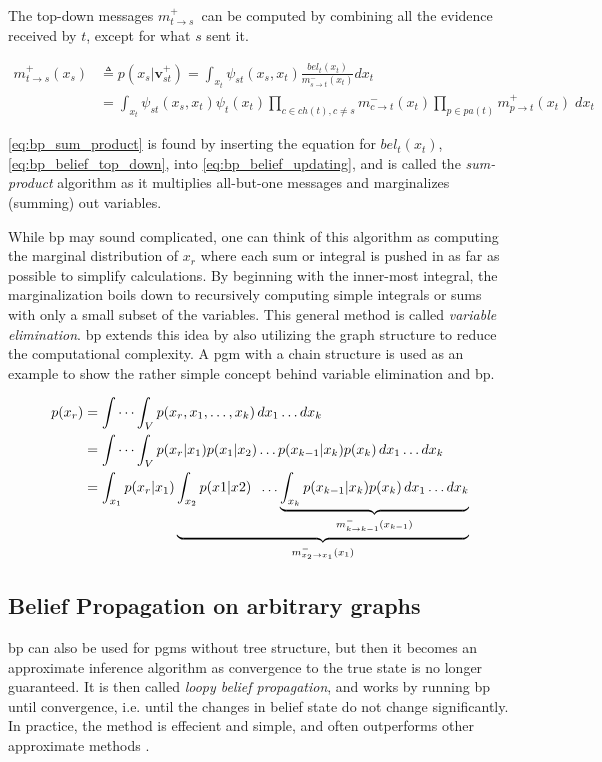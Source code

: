 The top-down messages $m_{t \to s}^+$ can be computed by combining all the evidence received by $t$, except for what $s$ sent it.

\begin{subequations}
\begin{align}
    m_{t \to s}^+(x_s) &\triangleq p(x_s | \mathbf{v}_{st}^+) = \int_{x_t}\psi_{st}(x_s, x_t)\frac{bel_t(x_t)}{m_{s \to t}^-(x_t)}dx_t \label{eq:bp_belief_updating}\\
    &= \int_{x_t} \psi_{st}(x_s, x_t)\psi_t(x_t) \prod_{c \in ch(t), c \neq s} m_{c \to t}^-(x_t) \prod_{p \in pa(t)} m_{p \to t}^+(x_t) \; dx_t\label{eq:bp_sum_product}
\end{align}
\end{subequations}

\cref{eq:bp_sum_product} is found by inserting the equation for $bel_t(x_t)$, \cref{eq:bp_belief_top_down}, into \cref{eq:bp_belief_updating}, and is called the \textit{sum-product} algorithm as it multiplies all-but-one messages and marginalizes (summing) out variables. 

While \acrshort{bp} may sound complicated, one can think of this algorithm as computing the marginal distribution of $x_r$ where each sum or integral is pushed in as far as possible to simplify calculations. By beginning with the inner-most integral, the marginalization boils down to recursively computing simple integrals or sums with only a small subset of the variables. This general method is called \textit{variable elimination}\cite{murphy}. \acrshort{bp} extends this idea by also utilizing the graph structure to reduce the computational complexity. A \acrshort{pgm} with a chain structure is used as an example to show the rather simple concept behind variable elimination and \acrshort{bp}.

\begin{subequations}
\begin{align}
p(x_r) &= \idotsint_V p(x_r, x_1,\dots,x_k) \,dx_1 \dots dx_k\\
&= \idotsint_V p(x_r | x_1)p(x_1|x_2)\dots p(x_{k-1} | x_k)p(x_k) \, dx_1 \dots dx_k\\
&= \int_{x_1} p(x_r | x_1)\underbrace{\int_{x_2}p(x1 | x2) \; \;  \dots \underbrace{\int_{x_k} p(x_{k-1} | x_k)p(x_k) \, dx_1 \dots dx_k}_{m_{k\to k-1}^-(x_{k-1})}}_{m_{x_2 \to x_1}^-(x_1)}
\end{align}
\end{subequations}

\subsection{Belief Propagation on arbitrary graphs}
\acrshort{bp} can also be used for \acrshort{pgm}s without tree structure, but then it becomes an approximate inference algorithm as convergence to the true state is no longer guaranteed. It is then called \textit{loopy belief propagation}, and works by running \acrshort{bp} until convergence, i.e. until the changes in belief state do not change significantly.  In practice, the method is effecient and simple, and often outperforms other approximate methods \cite{murphy}.

